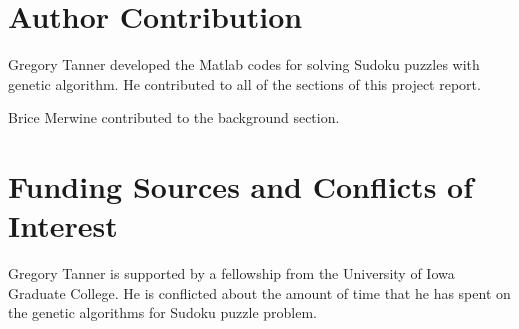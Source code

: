 \documentclass[english]{article}
\begin{document}
\section{Author Contribution}

Gregory Tanner developed the Matlab codes for solving Sudoku puzzles
with genetic algorithm. He contributed to all of the sections of this project report.

Brice Merwine contributed to the background section.

\section{Funding Sources and Conflicts of Interest}

Gregory Tanner is supported by a fellowship from the University of
Iowa Graduate College. He is conflicted about the amount of time that
he has spent on the genetic algorithms for Sudoku puzzle problem.




\end{document}
